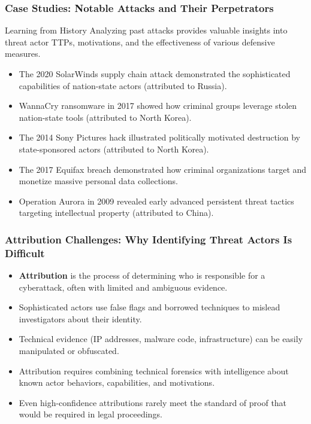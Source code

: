 \documentclass{beamer}
\begin{document}
\begin{frame}
    \frametitle{Case Studies: Notable Attacks and Their Perpetrators}
    
    \begin{block}{Learning from History}
        Analyzing past attacks provides valuable insights into threat actor TTPs, motivations, and the effectiveness of various defensive measures.
    \end{block}
    
    \begin{itemize}
        \item The 2020 SolarWinds supply chain attack demonstrated the sophisticated capabilities of nation-state actors (attributed to Russia).
        \item WannaCry ransomware in 2017 showed how criminal groups leverage stolen nation-state tools (attributed to North Korea).
        \item The 2014 Sony Pictures hack illustrated politically motivated destruction by state-sponsored actors (attributed to North Korea).
        \item The 2017 Equifax breach demonstrated how criminal organizations target and monetize massive personal data collections.
        \item Operation Aurora in 2009 revealed early advanced persistent threat tactics targeting intellectual property (attributed to China).
    \end{itemize}
\end{frame}

\begin{frame}
    \frametitle{Attribution Challenges: Why Identifying Threat Actors Is Difficult}
    
    \begin{itemize}
        \item \textbf{Attribution} is the process of determining who is responsible for a cyberattack, often with limited and ambiguous evidence.
        \item Sophisticated actors use false flags and borrowed techniques to mislead investigators about their identity.
        \item Technical evidence (IP addresses, malware code, infrastructure) can be easily manipulated or obfuscated.
        \item Attribution requires combining technical forensics with intelligence about known actor behaviors, capabilities, and motivations.
        \item Even high-confidence attributions rarely meet the standard of proof that would be required in legal proceedings.
    \end{itemize}
\end{frame}
\end{document}
